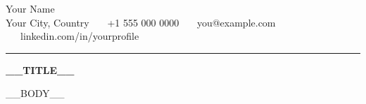 \documentclass[11pt]{article}
\begin{document}
\color{textcol}

{\avenirlight\fontsize{22}{22}\selectfont{}Your Name}\\[3pt]
{\avenirmedium\fontsize{9.5}{12}\selectfont\color{greycol}%
Your City, Country \ \textbar\ \ +1 555 000 0000 \ \textbar\ \ you@example.com \ \textbar\ \ linkedin.com/in/yourprofile}\\[6pt]
{\color{rulecol}\rule{\linewidth}{0.6pt}}

\vspace{6pt}
{\bfseries\fontsize{12}{15}\selectfont __TITLE__\par}
\vspace{2pt}

__BODY__
\end{document}
